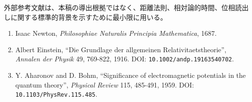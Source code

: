 \documentclass[
]{article}
\providecommand{\tightlist}{%
  \setlength{\itemsep}{0pt}\setlength{\parskip}{0pt}}
\begin{document}
外部参考文献は、本稿の導出根拠ではなく、距離法則、相対論的時間、位相読出しに関する標準的背景を示すために最小限に用いる。

\begin{enumerate}
\def\labelenumi{\arabic{enumi}.}
\setcounter{enumi}{7}
\tightlist
\item
  Isaac Newton, \emph{Philosophiae Naturalis Principia Mathematica},
  1687.
\item
  Albert Einstein, ``Die Grundlage der allgemeinen
  Relativitaetstheorie'', \emph{Annalen der Physik} 49, 769-822, 1916.
  DOI: \texttt{10.1002/andp.19163540702}.
\item
  Y. Aharonov and D. Bohm, ``Significance of electromagnetic potentials
  in the quantum theory'', \emph{Physical Review} 115, 485-491, 1959.
  DOI: \texttt{10.1103/PhysRev.115.485}.
\end{enumerate}
\end{document}
